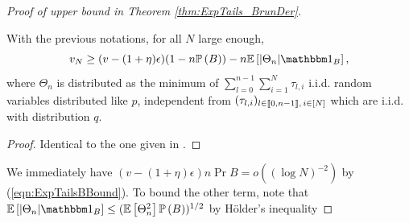 \begin{proof}[Proof of upper bound in Theorem \ref{thm:ExpTails_BrunDer}]
\begin{lemma}
With the previous notations, for all $N$ large enough, 
\begin{equation}
v_N \geq (v - (1 + \eta)\epsilon)(1 - n \Pr{B}) - n \Ex{|\Theta_n| \Ind_B}, 
\end{equation}
where $\Theta_n$ is distributed as the minimum of $\sum_{l = 0}^{n-1} \sum_{i=1}^N \tau_{l, i}$ i.i.d. random variables distributed like $p$, independent from $(\tau_{l,i})_{l \in \llbracket0, n-1\rrbracket,\, i \in [N]}$ which are i.i.d. with distribution $q$. 
\end{lemma}
\begin{proof}
Identical to the one given in \cite{exp_tails}. 
\end{proof}
We immediately have $(v - (1 + \eta)\epsilon) n \Pr{B} = o((\log N)^{-2})$ by (\ref{eqn:ExpTailsBBound}). To bound the other term, note that $\Ex{|\Theta_n| \Ind_B} \leq (\Ex{\Theta_n^2}\Pr{B})^{1/2}$ by Hölder's inequality
\end{proof}
